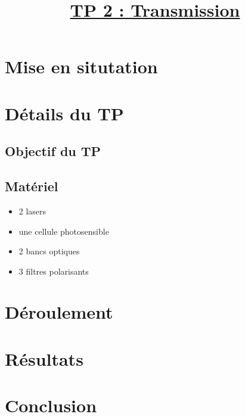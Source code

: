\documentclass[french]{article}
\title{\textbf{\underline{TP 2 : Transmission}}}
\author{}
\begin{document}
\maketitle

\section{Mise en situtation}


\section{Détails du TP}

\subsection{Objectif du TP}

\subsection{Matériel}

\begin{itemize}
    \item 2 lasers
    \item une cellule photosensible
    \item 2 bancs optiques
    \item 3 filtres polarisants
\end{itemize}

\section{Déroulement}

\section{Résultats}

\section{Conclusion}
\end{document}
